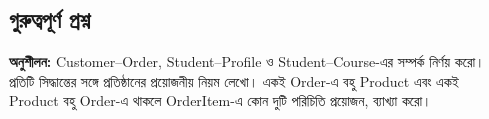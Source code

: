 








\subsection{গুরুত্বপূর্ণ প্রশ্ন}
\textbf{অনুশীলন:} Customer--Order, Student--Profile ও Student--Course-এর সম্পর্ক নির্ণয় করো। প্রতিটি সিদ্ধান্তের সঙ্গে প্রতিষ্ঠানের প্রয়োজনীয় নিয়ম লেখো। একই Order-এ বহু Product এবং একই Product বহু Order-এ থাকলে OrderItem-এ কোন দুটি পরিচিতি প্রয়োজন, ব্যাখ্যা করো।

